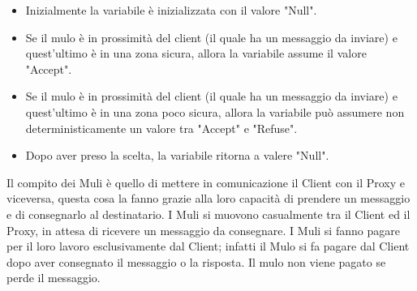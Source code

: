 \documentclass[13pt,a4paper]{article}
\begin{document}
\begin{itemize}
\begin{itemize}
	\begin{itemize}
		\item Inizialmente la variabile è inizializzata con il valore "Null".
		\item Se il mulo è in prossimità del client (il quale ha un messaggio da inviare) e quest'ultimo è in una zona sicura, allora la variabile assume il valore "Accept". 
		\item Se il mulo è in prossimità del client (il quale ha un messaggio da inviare) e quest'ultimo è in una zona poco sicura, allora la variabile può assumere non deterministicamente un valore tra "Accept" e "Refuse".
		\item Dopo aver preso la scelta, la variabile ritorna a valere "Null".
	\end{itemize}
	\end{itemize}
	Il compito dei Muli è  quello di mettere in comunicazione il Client con il Proxy e viceversa, questa cosa la fanno grazie alla loro capacità di prendere un messaggio e di consegnarlo al destinatario. I Muli si muovono casualmente tra il Client ed il Proxy, in attesa di ricevere un messaggio da consegnare. I Muli si fanno pagare per il loro lavoro esclusivamente dal Client; infatti il Mulo si fa pagare dal Client dopo aver consegnato il messaggio o la risposta. Il mulo non viene pagato se perde il messaggio.
	

\end{itemize}
\end{document}
